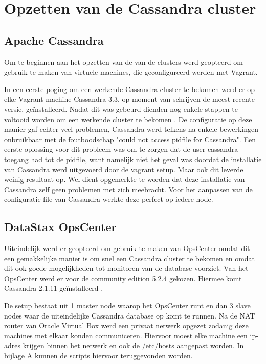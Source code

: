 \chapter{Opzetten van de Cassandra cluster}
\label{ch:cassandra_cluster}

\section{Apache Cassandra}
Om te beginnen aan het opzetten van de van de clusters werd geopteerd om gebruik te maken van virtuele machines, die geconfigureerd werden met Vagrant.

In een eerste poging om een werkende Cassandra cluster te bekomen werd er op elke Vagrant machine Cassandra 3.3, op moment van schrijven de meest recente versie, geïnstalleerd.
Nadat dit was gebeurd dienden nog enkele stappen te voltooid worden om een werkende cluster te bekomen \citep{DataStax2016}.
De configuratie op deze manier gaf echter veel problemen, Cassandra werd telkens na enkele bewerkingen onbruikbaar met de foutboodschap "could not access pidfile for Cassandra".
Een eerste oplossing voor dit probleem was om te zorgen dat de user cassandra toegang had tot de pidfile, want namelijk niet het geval was doordat de installatie van Cassandra werd uitgevoerd door de vagrant setup.
Maar ook dit leverde weinig resultaat op.
Wel dient opgemerkte te worden dat deze installatie van Cassandra zelf geen problemen met zich meebracht.
Voor het aanpassen van de configuratie file van Cassandra werkte deze perfect op iedere node.

\section{DataStax OpsCenter}

Uiteindelijk werd er geopteerd om gebruik te maken van OpsCenter omdat dit een gemakkelijke manier is om snel een Cassandra cluster te bekomen en omdat dit ook goede mogelijkheden tot monitoren van de database voorziet.
Van het OpsCenter werd er voor de community edition 5.2.4 gekozen.
Hiermee komt Cassandra 2.1.11 geïnstalleerd \citep{Cantoni2016}.

De setup bestaat uit 1 master node waarop het OpsCenter runt en dan 3 slave nodes waar de uiteindelijke Cassandra database op komt te runnen.
Na de NAT router van Oracle Virtual Box werd een privaat netwerk opgezet zodanig deze machines met elkaar konden communiceren.
Hiervoor moest elke machine een ip-adres krijgen binnen het netwerk en ook de /etc/hosts aangepast worden.
In bijlage A kunnen de scripts hiervoor teruggevonden worden.

